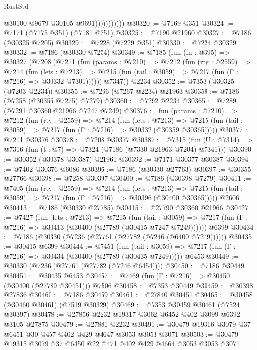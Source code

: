 \begin{lexlean}{RustStd}
\begin{coremodule}
                          @30100
                          @9679
                          @30105
                          @9691)))))))))))
@30320 := @7169 @351
@30324 := @7171 (@7175 @351) (@7181 @351)
@30325 := @7190 @21960
@30327 := @7186 (@30325 @7205)
@30329 := @7228 (@7229 @351)
@30330 := @7224 @30329
@30332 := @7186 (@30330 @7254)
@30349 := @7185
    (fun (fn : @395) =>
    @30327
      (@7208
        (@7211
          (fun (params : @7210) =>
          @7212
            (fun (rty : @2559) =>
            @7214
              (fun (lets : @7213) =>
              @7215 (fun (tail : @3059) => @7217 (fun (Γ : @7216) => @30332 @7301))))))
        @7347))
    @2234
@30352 := @7353 (@30325 (@7203 @2234))
@30355 := @7266 (@7267 @2234) @21963
@30359 := @7186 (@7258 (@30355 @7275) @7279)
@30360 := @7292 @2234
@30365 := @7289 (@7291 @30360 @21966 @7247 @7249)
@30376 := fun (params : @7210) =>
  @7212
    (fun (rty : @2559) =>
    @7214
      (fun (lets : @7213) =>
      @7215 (fun (tail : @3059) => @7217 (fun (Γ : @7216) => @30332 (@30359 @30365)))))
@30377 := @7211 @30376
@30378 := @7208 @30377
@30387 := @7315
    (fun (U : @7314) => @7316 (fun (t : @7) => @7324 (@7186 (@7330 @21963 @7204) @7341)))
@30390 := @30352 (@30378 @30387) @21961
@30392 := @7171 @30377 @30387
@30394 := @7402 @30376 @6086
@30396 := @7186 (@30330 @27763)
@30397 := @30355 @27766
@30398 := @7258 @30397
@30400 := @7186 (@30398 @7279)
@30411 := @7405
    (fun (rty : @2559) =>
    @7214
      (fun (lets : @7213) =>
      @7215 (fun (tail : @3059) => @7217 (fun (Γ : @7216) => @30396 (@30400 @30365)))))
    @2606
@30413 := @7186 (@30330 @27785)
@30415 := @27790 @30360 @21966
@30427 := @7427
    (fun (lets : @7213) =>
    @7215
      (fun (tail : @3059) =>
      @7217 (fun (Γ : @7216) => @30413 (@30400 (@27789 (@30415 @7247 @7249))))))
    @6399
@30434 := @7186 (@30330 (@7236 (@27761 (@27782 (@7246 (@6400 @7249))))))
@30435 := @30415 @6399
@30444 := @7451
    (fun (tail : @3059) => @7217 (fun (Γ : @7216) => @30434 (@30400 (@27789 (@30435 @7249)))))
    @6453
@30449 := @30330 (@7236 (@27761 (@27782 (@7246 @6454))))
@30450 := @7186 @30449
@30451 := @30435 @6453
@30457 := @7469 (fun (Γ : @7216) => @30450 (@30400 (@27789 @30451))) @7506
@30458 := @7353 @30449
@30459 := @30398 @27836
@30460 := @7186 @30459
@30461 := @27840 @30451
@30465 := @30458 (@30460 @30461) (@7519 @30329)
@30469 := @7353 @30459 @30461 (@7524 @30397)
@30478 := @27856 @2232 @19317 @3062 @6452 @402 @3099 @6392 @3105 @27875
@30479 := @27881 @2232
@30491 := @30479 @19316 @3079 @37 @6451 @30 @457 @402 @429 @4647 @3053 @3053 @3071
@30503 := @30479 @19315 @3079 @37 @6450 @22 @471 @402 @429 @4664 @3053 @3053 @3071

\end{coremodule}
\end{lexlean}
